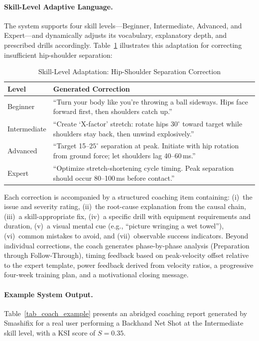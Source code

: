 \documentclass[pdflatex,sn-mathphys-num]{sn-jnl}%
\theoremstyle{thmstyleone}%
\theoremstyle{thmstyletwo}%
\theoremstyle{thmstylethree}%
\begin{document}
\paragraph{Skill-Level Adaptive Language.}
The system supports four skill levels---Beginner, Intermediate, Advanced, and Expert---and dynamically adjusts its vocabulary, explanatory depth, and prescribed drills accordingly. Table~\ref{tab_skill_adapt} illustrates this adaptation for correcting insufficient hip-shoulder separation:

\begin{table}[h]
\caption{Skill-Level Adaptation: Hip-Shoulder Separation Correction}\label{tab_skill_adapt}
\centering
\small
\setlength{\tabcolsep}{4pt}
\renewcommand{\arraystretch}{1.3}
\begin{tabular}{|l|p{10.5cm}|}
\hline
\textbf{Level} & \textbf{Generated Correction} \\
\hline
Beginner & ``Turn your body like you're throwing a ball sideways. Hips face forward first, then shoulders catch up.'' \\
\hline
Intermediate & ``Create `X-factor' stretch: rotate hips $30^{\circ}$ toward target while shoulders stay back, then unwind explosively.'' \\
\hline
Advanced & ``Target 15--$25^{\circ}$ separation at peak. Initiate with hip rotation from ground force; let shoulders lag 40--60\,ms.'' \\
\hline
Expert & ``Optimize stretch-shortening cycle timing. Peak separation should occur 80--100\,ms before contact.'' \\
\hline
\end{tabular}
\end{table}

Each correction is accompanied by a structured coaching item containing: (i)~the issue and severity rating, (ii)~the root-cause explanation from the causal chain, (iii)~a skill-appropriate fix, (iv)~a specific drill with equipment requirements and duration, (v)~a visual mental cue (e.g., ``picture wringing a wet towel''), (vi)~common mistakes to avoid, and (vii)~observable success indicators. Beyond individual corrections, the coach generates phase-by-phase analysis (Preparation through Follow-Through), timing feedback based on peak-velocity offset relative to the expert template, power feedback derived from velocity ratios, a progressive four-week training plan, and a motivational closing message.

\paragraph{Example System Output.}
Table~\ref{tab_coach_example} presents an abridged coaching report generated by Smashifix for a real user performing a Backhand Net Shot at the Intermediate skill level, with a KSI score of $S = 0.35$.
\end{document}
